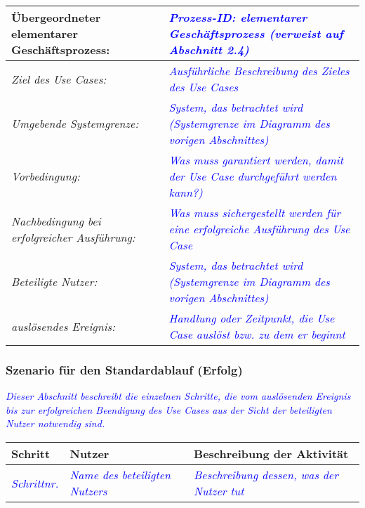 \begin{table}[H]
    \begin{tabularx}{\textwidth}{| l | X |} 
	\hline    
    \"Ubergeordneter elementarer Geschäftsprozess: & \textcolor{blue}{\textit{Prozess-ID: elementarer Geschäftsprozess (verweist auf Abschnitt 2.4)}} \\ \hline
    \textit{Ziel des Use Cases:} & \textcolor{blue}{\textit{Ausführliche Beschreibung des Zieles des Use Cases}} \\ \hline
    \textit{Umgebende Systemgrenze:} & \textcolor{blue}{\textit{System, das betrachtet wird (Systemgrenze im Diagramm des vorigen Abschnittes)}} \\ \hline
    \textit{Vorbedingung:} & \textcolor{blue}{\textit{Was muss garantiert werden, damit der Use Case durchgeführt werden kann?)}} \\ \hline
    \textit{Nachbedingung bei erfolgreicher Ausführung:} & \textcolor{blue}{\textit{Was muss sichergestellt werden für eine erfolgreiche Ausführung des Use Case}} \\ \hline
    \textit{Beteiligte Nutzer:} & \textcolor{blue}{\textit{System, das betrachtet wird (Systemgrenze im Diagramm des vorigen Abschnittes)}} \\ \hline
    \textit{auslösendes Ereignis:} & \textcolor{blue}{\textit{Handlung oder Zeitpunkt, die Use Case auslöst bzw. zu dem er beginnt}} \\ \hline
    \end{tabularx}
\end{table}

\subsubsection*{Szenario für den Standardablauf (Erfolg)}
\textcolor{blue}{\textit{Dieser Abschnitt beschreibt die einzelnen Schritte, die vom auslösenden Ereignis bis zur erfolgreichen Beendigung des Use Cases aus der Sicht der beteiligten Nutzer notwendig sind.}}

\begin{table}[H]
    \begin{tabularx}{\textwidth}{| X | X | X |} 
	\hline    
    \textbf{Schritt} & \textbf{Nutzer} & \textbf{Beschreibung der Aktivität} \\ \hline
    \textcolor{blue}{\textit{Schrittnr.}} & \textcolor{blue}{\textit{Name des beteiligten Nutzers}} & \textcolor{blue}{\textit{Beschreibung dessen, was der Nutzer tut}} \\ \hline
    \end{tabularx}
\end{table}


